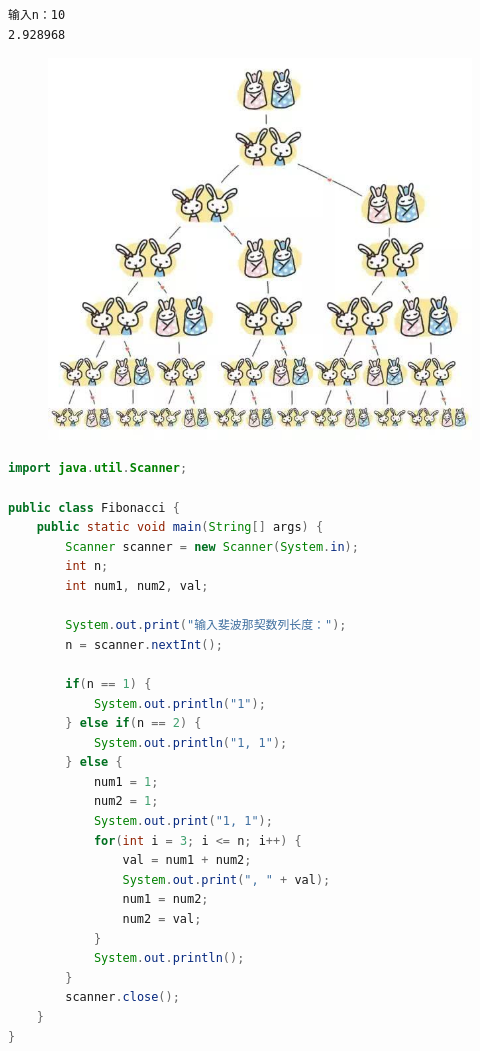 \begin{tcolorbox}
    \begin{verbatim}
输入n：10
2.928968
\end{verbatim}
\end{tcolorbox}

\vspace{0.5cm}


\begin{figure}[H]
    \centering
    \includegraphics[scale=0.45]{img/Chapter4/4-4/1.png}
\end{figure}

\begin{lstlisting}[language=Java]
import java.util.Scanner;

public class Fibonacci {
    public static void main(String[] args) {
        Scanner scanner = new Scanner(System.in);
        int n;
        int num1, num2, val;
        
        System.out.print("输入斐波那契数列长度：");
        n = scanner.nextInt();
        
        if(n == 1) {
            System.out.println("1");
        } else if(n == 2) {
            System.out.println("1, 1");
        } else {
            num1 = 1;
            num2 = 1;
            System.out.print("1, 1");
            for(int i = 3; i <= n; i++) {
                val = num1 + num2;
                System.out.print(", " + val);
                num1 = num2;
                num2 = val;
            }
            System.out.println();
        }
        scanner.close();
    }
}
\end{lstlisting}

